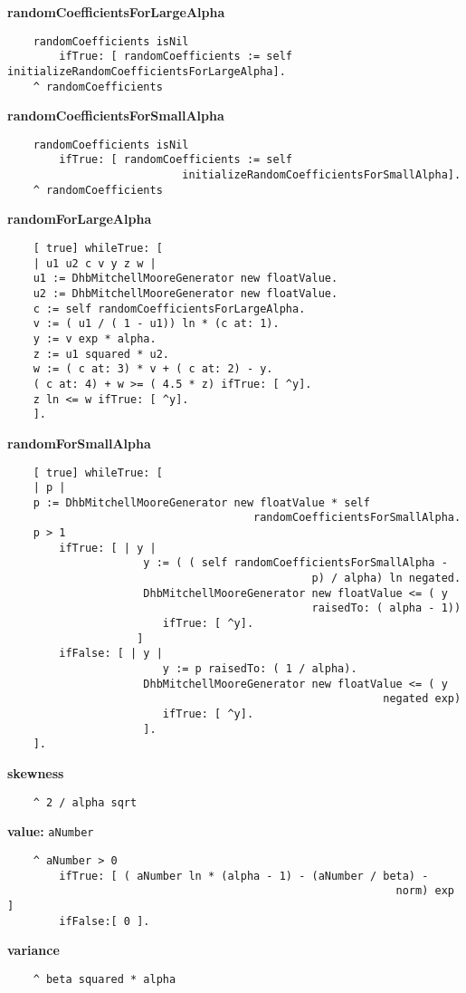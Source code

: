 {\bf randomCoefficientsForLargeAlpha}
\begin{verbatim}
    randomCoefficients isNil
        ifTrue: [ randomCoefficients := self initializeRandomCoefficientsForLargeAlpha].
    ^ randomCoefficients
\end{verbatim}
{\bf randomCoefficientsForSmallAlpha}
\begin{verbatim}
    randomCoefficients isNil
        ifTrue: [ randomCoefficients := self 
                           initializeRandomCoefficientsForSmallAlpha].
    ^ randomCoefficients
\end{verbatim}
{\bf randomForLargeAlpha}
\begin{verbatim}
    [ true] whileTrue: [
    | u1 u2 c v y z w |
    u1 := DhbMitchellMooreGenerator new floatValue.
    u2 := DhbMitchellMooreGenerator new floatValue.
    c := self randomCoefficientsForLargeAlpha.
    v := ( u1 / ( 1 - u1)) ln * (c at: 1).
    y := v exp * alpha.
    z := u1 squared * u2.
    w := ( c at: 3) * v + ( c at: 2) - y.
    ( c at: 4) + w >= ( 4.5 * z) ifTrue: [ ^y].
    z ln <= w ifTrue: [ ^y].
    ].
\end{verbatim}
{\bf randomForSmallAlpha}
\begin{verbatim}
    [ true] whileTrue: [
    | p |
    p := DhbMitchellMooreGenerator new floatValue * self 
                                      randomCoefficientsForSmallAlpha.
    p > 1
        ifTrue: [ | y |
                     y := ( ( self randomCoefficientsForSmallAlpha - 
                                               p) / alpha) ln negated.
                     DhbMitchellMooreGenerator new floatValue <= ( y 
                                               raisedTo: ( alpha - 1))
                        ifTrue: [ ^y].
                    ]
        ifFalse: [ | y |
                        y := p raisedTo: ( 1 / alpha).
                     DhbMitchellMooreGenerator new floatValue <= ( y 
                                                          negated exp)
                        ifTrue: [ ^y].
                     ].
    ].
\end{verbatim}
{\bf skewness}
\begin{verbatim}
    ^ 2 / alpha sqrt
\end{verbatim}
{\bf value:} {\tt aNumber}
\begin{verbatim}
    ^ aNumber > 0
        ifTrue: [ ( aNumber ln * (alpha - 1) - (aNumber / beta) - 
                                                            norm) exp ]
        ifFalse:[ 0 ].
\end{verbatim}
{\bf variance}
\begin{verbatim}
    ^ beta squared * alpha
\end{verbatim}

